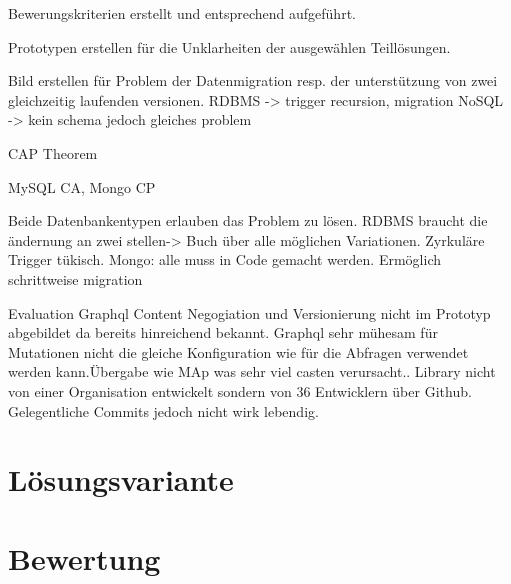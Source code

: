 Bewerungskriterien erstellt und entsprechend aufgeführt.

Prototypen erstellen für die Unklarheiten der ausgewählen Teillösungen.

Bild erstellen für Problem der Datenmigration resp. der unterstützung von zwei gleichzeitig laufenden versionen.
RDBMS -> trigger recursion, migration
NoSQL -> kein schema jedoch gleiches problem

CAP Theorem

MySQL CA, Mongo CP

Beide Datenbankentypen erlauben das Problem zu lösen. RDBMS braucht die ändernung an zwei stellen-> Buch über alle möglichen Variationen. Zyrkuläre Trigger tükisch. Mongo: alle muss in Code gemacht werden. Ermöglich schrittweise migration


Evaluation Graphql
Content Negogiation und Versionierung nicht im Prototyp abgebildet da bereits hinreichend bekannt.
Graphql sehr mühesam für Mutationen nicht die gleiche Konfiguration wie für die Abfragen verwendet werden kann.Übergabe wie MAp was sehr viel casten verursacht.. Library nicht von einer Organisation entwickelt sondern von 36 Entwicklern über Github. Gelegentliche Commits jedoch nicht wirk lebendig. 

\section{Lösungsvariante}

\section{Bewertung}











